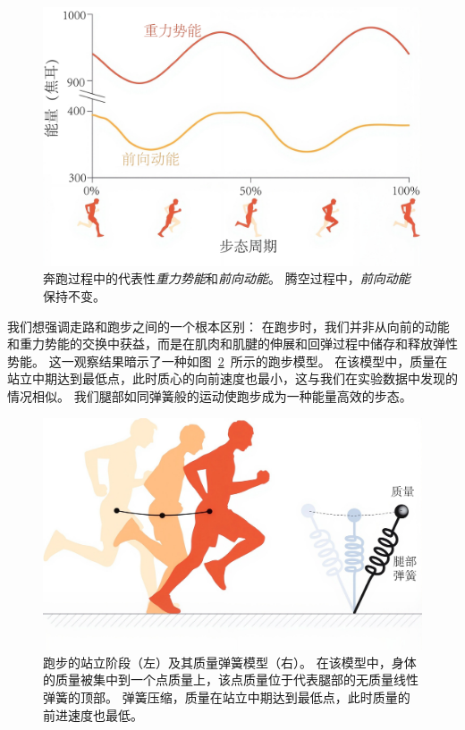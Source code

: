 \begin{figure}[!htb]
	\centering
	\includegraphics[width=0.9\linewidth]{chap3/3_4}
	\caption{奔跑过程中的代表性\textit{重力势能}和\textit{前向动能}。
		腾空过程中，\textit{前向动能}保持不变\cite{yong2014differences}。 \label{fig:3_4}}
\end{figure}


我们想强调走路和跑步之间的一个根本区别：
在跑步时，我们并非从向前的动能和重力势能的交换中获益，而是在肌肉和肌腱的伸展和回弹过程中储存和释放弹性势能。
这一观察结果暗示了一种如图~\ref{fig:3_5}~所示的跑步模型。
在该模型中，质量在站立中期达到最低点，此时质心的向前速度也最小，这与我们在实验数据中发现的情况相似。
我们腿部如同弹簧般的运动使跑步成为一种能量高效的步态。

\begin{figure}[!htb]
	\centering
	\includegraphics[width=1.0\linewidth]{chap3/3_5}
	\caption{跑步的站立阶段（左）及其质量弹簧模型（右）。
		在该模型中，身体的质量被集中到一个点质量上，该点质量位于代表腿部的无质量线性弹簧的顶部。
		弹簧压缩，质量在站立中期达到最低点，此时质量的前进速度也最低。 \label{fig:3_5}}
\end{figure}


